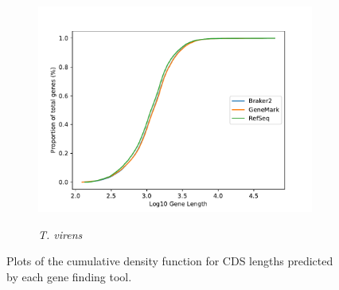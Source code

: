 \begin{figure}[ht]
  \ContinuedFloat
  \centering
    \begin{subfigure}{0.8\textwidth}
      \includegraphics[width=\textwidth]{figures/t-virens-cdf-lengths-log.pdf}
      \label{fig:tvirens-lengths}
      \caption{\textit{T. virens}}
    \end{subfigure}
  \label{fig:cdf-lengths}
  \caption[Cumulative Density Function of Gene Lengths]{Plots of the
    cumulative density function for CDS lengths predicted by each gene
    finding tool.}
\end{figure}
